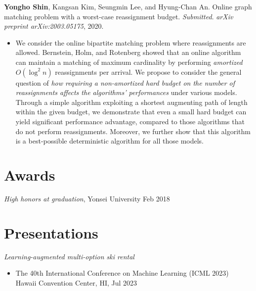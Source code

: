 \documentclass{cv}
\begin{document}
\textbf{Yongho Shin}, Kangsan Kim, Seungmin Lee, and Hyung-Chan An. Online graph matching problem with a worst-case reassignment budget. \emph{Submitted}. \emph{arXiv preprint arXiv:2003.05175}, 2020.
\vspace{\killinitspace}
\begin{itemize}
\item We consider the online bipartite matching problem where reassignments are allowed. Bernstein, Holm, and Rotenberg showed that an online algorithm can maintain a matching of maximum cardinality by performing \emph{amortized} $O(\log^2 n)$ reassignments per arrival. We propose to consider the general question of \emph{how requiring a \emph{non-amortized} hard budget on the number of reassignments affects the algorithms' performances} under various models. Through a simple algorithm exploiting a shortest augmenting path of length within the given budget, we demonstrate that even a small hard budget can yield significant performance advantage, compared to those algorithms that do not perform reassignments. Moreover, we further show that this algorithm is a best-possible deterministic algorithm for all those models.
\end{itemize}


\section{Awards}
\textsl{High honors at graduation}, Yonsei University \hfill Feb 2018

\section{Presentations}
\textsl{Learning-augmented multi-option ski rental}
\vspace{\killinitspace}
\begin{itemize}
\item The 40th International Conference on Machine Learning (ICML 2023) \\ \phantom{.} \hfill Hawaii Convention Center, HI, Jul 2023
\end{itemize}
\end{document}
